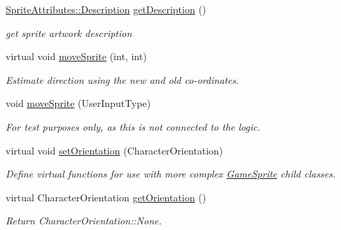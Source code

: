 \begin{DoxyCompactItemize}
\mbox{\hyperlink{namespace_sprite_attributes_a3ece96d6288b14d53d84e2138392395c}{Sprite\+Attributes\+::\+Description}} \mbox{\hyperlink{class_game_sprite_a2ca8b811d79fbceae18e02c934e3e85b}{get\+Description}} ()
\begin{DoxyCompactList}\small\item\em get sprite artwork description \end{DoxyCompactList}\item 
\mbox{\label{class_game_sprite_a1cb6989acf2cc9666be1bc940b31d7c7}} 
virtual void \mbox{\hyperlink{class_game_sprite_a1cb6989acf2cc9666be1bc940b31d7c7}{move\+Sprite}} (int, int)
\begin{DoxyCompactList}\small\item\em Estimate direction using the new and old co-\/ordinates. \end{DoxyCompactList}\item 
\mbox{\label{class_game_sprite_afe8e3f2ec427eaa11e805a13c3e74428}} 
void \mbox{\hyperlink{class_game_sprite_afe8e3f2ec427eaa11e805a13c3e74428}{move\+Sprite}} (User\+Input\+Type)
\begin{DoxyCompactList}\small\item\em For test purposes only, as this is not connected to the logic. \end{DoxyCompactList}\item 
\mbox{\label{class_game_sprite_acb65331428a0ae05f1ef6f521d51e4e7}} 
virtual void \mbox{\hyperlink{class_game_sprite_acb65331428a0ae05f1ef6f521d51e4e7}{set\+Orientation}} (Character\+Orientation)
\begin{DoxyCompactList}\small\item\em Define virtual functions for use with more complex \mbox{\hyperlink{class_game_sprite}{Game\+Sprite}} child classes. \end{DoxyCompactList}\item 
\mbox{\label{class_game_sprite_aecf8f0273b4e847aa532f8980fb78997}} 
virtual Character\+Orientation \mbox{\hyperlink{class_game_sprite_aecf8f0273b4e847aa532f8980fb78997}{get\+Orientation}} ()
\begin{DoxyCompactList}\small\item\em Return Character\+Orientation\+::\+None. \end{DoxyCompactList}\item 

\end{DoxyCompactItemize}

